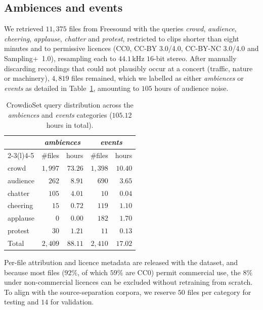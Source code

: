 \subsection{Ambiences and events}
\label{ssec:mss_ambiences}

We retrieved $11{,}375$ files from Freesound \citep{anastasopoulou2025freesound}
with the queries \emph{crowd}, \emph{audience}, \emph{cheering}, \emph{applause},
\emph{chatter} and \emph{protest}, restricted to clips shorter than eight minutes
and to permissive licences (CC0, CC-BY 3.0/4.0, CC-BY-NC 3.0/4.0 and
Sampling+~1.0), resampling each to $44.1\,\text{kHz}$ $16$-bit stereo. After
manually discarding recordings that could not plausibly occur at a concert
(traffic, nature or machinery), $4{,}819$ files remained, which we labelled as
either \emph{ambiences} or \emph{events} as detailed in
Table~\ref{tab:crowdioset_queries}, amounting to $105$ hours of audience noise.


\begin{table}[htpb]
  \centering
  \footnotesize
  \caption{CrowdioSet query distribution across the \emph{ambiences} and
  \emph{events} categories ($105.12$ hours in total).}
  \label{tab:crowdioset_queries}
  \begin{tabular}{@{}lrrrr@{}}
    \toprule
     & \multicolumn{2}{c}{\emph{ambiences}} & \multicolumn{2}{c}{\emph{events}} \\
    \cmidrule(lr){2-3}\cmidrule(l){4-5}
     & \#files & hours & \#files & hours \\
    \midrule
    crowd    & $1{,}997$ & $73.26$ & $1{,}398$ & $10.40$ \\
    audience & $262$     & $8.91$  & $690$     & $3.65$  \\
    chatter  & $105$     & $4.01$  & $10$      & $0.04$  \\
    cheering & $15$      & $0.72$  & $119$     & $1.10$  \\
    applause & $0$       & $0.00$  & $182$     & $1.70$  \\
    protest  & $30$      & $1.21$  & $11$      & $0.13$  \\
    \midrule
    Total    & $2{,}409$ & $88.11$ & $2{,}410$ & $17.02$ \\
    \bottomrule
  \end{tabular}
\end{table}

Per-file attribution and licence metadata are released with the dataset, and
because most files ($92\%$, of which $59\%$ are CC0) permit commercial use, the
$8\%$ under non-commercial licences can be excluded without retraining from
scratch. To align with the source-separation corpora, we reserve $50$ files per
category for testing and $14$ for validation.

